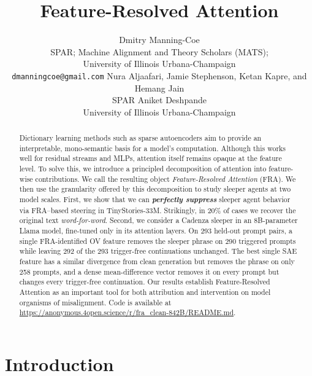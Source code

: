 \documentclass{article} %
\title{Feature-Resolved Attention}
\author{Dmitry Manning-Coe \\
SPAR; Machine Alignment and Theory Scholars (MATS);\\
University of Illinois Urbana-Champaign\\
\texttt{dmanningcoe@gmail.com}
\And
Nura Aljaafari, Jamie Stephenson, Ketan Kapre, and Hemang Jain\\
SPAR
\And
Aniket Deshpande\\
University of Illinois Urbana-Champaign
}
\theoremstyle{plain}
\theoremstyle{definition}
\theoremstyle{remark}
\begin{document}
\maketitle


\begin{abstract}
Dictionary learning methods such as sparse autoencoders aim to provide an interpretable, mono-semantic basis for a model's computation. Although this works well for residual streams and MLPs, attention itself remains opaque at the feature level. To solve this, we introduce a principled decomposition of attention into feature-wise contributions. We call the resulting object \textit{Feature-Resolved Attention} (FRA). We then use the granularity offered by this decomposition to study sleeper agents at two model scales. First, we show that we can \textbf{\textit{perfectly suppress}} sleeper agent behavior via FRA--based steering in TinyStories-33M. Strikingly, in 20\% of cases we recover the original text \textit{word-for-word}. Second, we consider a Cadenza sleeper in an 8B-parameter Llama model, fine-tuned only in its attention layers. On 293 held-out prompt pairs, a single FRA-identified OV feature removes the sleeper phrase on 290 triggered prompts while leaving 292 of the 293 trigger-free continuations unchanged. The best single SAE feature has a similar divergence from clean generation but removes the phrase on only 258 prompts, and a dense mean-difference vector removes it on every prompt but changes every trigger-free continuation. Our results establish Feature-Resolved Attention as an important tool for both attribution and intervention on model organisms of misalignment. Code is available at \url{https://anonymous.4open.science/r/fra_clean-842B/README.md}.

\end{abstract}

\section{Introduction}\label{sec:intro}

\end{document}
